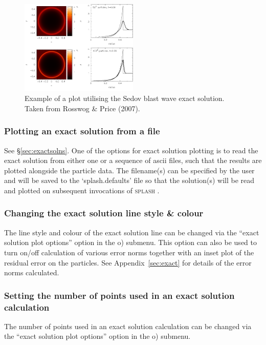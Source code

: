\documentclass[a4paper,10pt]{article}
\newcommand{\splash}{\textsc{splash }}
\begin{document}
\begin{figure}[h]
\begin{center}
\includegraphics[width=0.5\textwidth]{sedov_example.png}
\caption{Example of a plot utilising the Sedov blast wave exact solution. Taken from Rosswog \& Price (2007).}
\label{fig:sedov}
\end{center}
\end{figure}


\subsubsection{ Plotting an exact solution from a file}
 See \S\ref{sec:exactsolns}. One of the options for exact solution plotting is to read the exact solution from either one or a sequence of ascii files, such that the results are plotted alongside the particle data. The filename(s) can be specified by the user and will be saved to the `splash.defaults' file so that the solution(s) will be read and plotted on subsequent invocations of \splash.

\subsubsection{ Changing the exact solution line style \& colour}
 The line style and colour of the exact solution line can be changed via the ``exact solution plot options'' option in the o) submenu. This option can also be used to turn on/off calculation of various error norms
together with an inset plot of the residual error on the particles. See
Appendix~\ref{sec:exact} for details of the error norms calculated.

\subsubsection{ Setting the number of points used in an exact solution calculation}
The number of points used in an exact solution calculation can be changed via the ``exact solution plot options'' option in the o) submenu.
\end{document}

